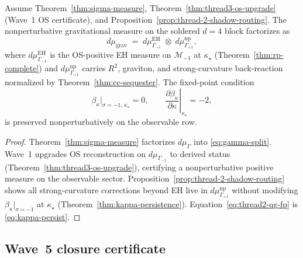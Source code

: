 \begin{theorem}
\label{thm:thread-2-qg}
Assume Theorem~\ref{thm:sigma-measure}, Theorem~\ref{thm:thread3-os-upgrade}
(Wave~1 OS certificate), and Proposition~\ref{prop:thread-2-shadow-routing}.
The nonperturbative gravitational measure on the soldered $d=4$ block
factorizes as
\begin{equation}\label{eq:thread2-qg-measure}
  d\mu_{\mathrm{grav}}
  \;=\;
  d\mu_{\Gamma_{-1}}^{\mathrm{EH}}
  \;\otimes\;
  d\mu_{\Gamma_{+1}}^{\mathrm{np}},
\end{equation}
where $d\mu_{\Gamma_{-1}}^{\mathrm{EH}}$ is the OS-positive EH measure on
$\mathcal{M}_{-1}$ at $\kappa_\star$ (Theorem~\ref{thm:rp-complete}) and
$d\mu_{\Gamma_{+1}}^{\mathrm{np}}$ carries $R^2$, graviton, and
strong-curvature back-reaction normalized by Theorem~\ref{thm:cc-sequester}.
The fixed-point condition
\begin{equation}\label{eq:thread2-qg-fp}
  \beta_\kappa\big|_{\sigma=-1,\,\kappa_\star}=0,
  \qquad
  \left.\frac{\partial\beta_\kappa}{\partial\kappa}\right|_{\kappa_\star}=-2,
\end{equation}
is preserved nonperturbatively on the observable row.
\end{theorem}

\begin{proof}
Theorem~\ref{thm:sigma-measure} factorizes $d\mu_\Gamma$ into
\eqref{eq:gamma-split}. Wave~1 upgrades OS reconstruction on
$d\mu_{\Gamma_{-1}}$ to derived status (Theorem~\ref{thm:thread3-os-upgrade}),
certifying a nonperturbative positive measure on the observable sector.
Proposition~\ref{prop:thread-2-shadow-routing} shows all
strong-curvature corrections beyond EH live in $d\mu_{\Gamma_{+1}}^{\mathrm{np}}$
without modifying $\beta_\kappa|_{\sigma=-1}$ at $\kappa_\star$
(Theorem~\ref{thm:kappa-persistence}). Equation~\eqref{eq:thread2-qg-fp}
is \eqref{eq:kappa-persist}.
\end{proof}

\subsection{Wave~5 closure certificate}
\label{sec:wave5-thread2:closure}

